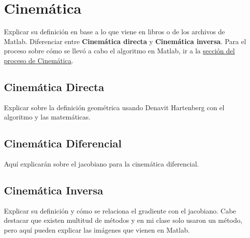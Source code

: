\section{Cinemática} \label{sec:cinematica}

Explicar su definición en base a lo que viene en libros o de los archivos de Matlab. Diferenciar entre \textbf{Cinemática directa} y \textbf{Cinemática inversa}.
Para el proceso sobre cómo se llevó a cabo el algoritmo en Matlab, ir a la  \hyperref[sec:proceso_cinematica]{sección del proceso de Cinemática}.

\subsection{Cinemática Directa}
Explicar sobre la definición geométrica usando Denavit Hartenberg con el algoritmo y las matemáticas.

\subsection{Cinemática Diferencial}
Aquí explicarán sobre el jacobiano para la cinemática diferencial.

\subsection{Cinemática Inversa}
Explicar su definición y cómo se relaciona el gradiente con el jacobiano. Cabe destacar que existen multitud de métodos y en mi clase solo usaron un método, pero aquí pueden explicar las imágenes que vienen en Matlab.

